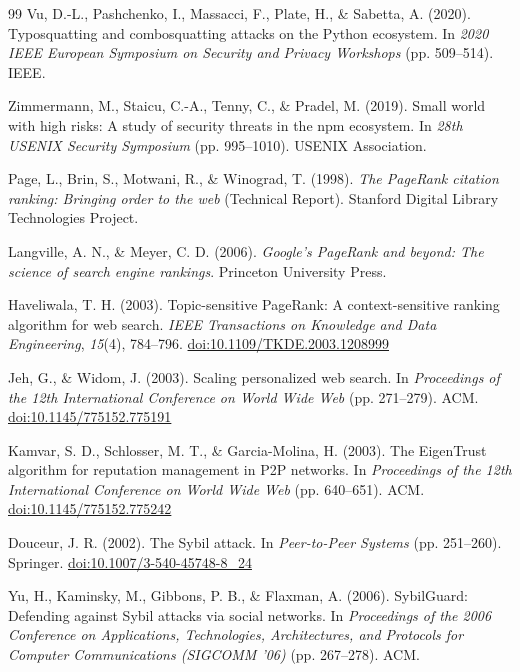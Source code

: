 \begin{thebibliography}{99}
 Vu, D.-L., Pashchenko, I., Massacci, F., Plate, H., \& Sabetta, A. (2020). Typosquatting and combosquatting attacks on the Python ecosystem. In \textit{2020 IEEE European Symposium on Security and Privacy Workshops} (pp. 509--514). IEEE.

 Zimmermann, M., Staicu, C.-A., Tenny, C., \& Pradel, M. (2019). Small world with high risks: A study of security threats in the npm ecosystem. In \textit{28th USENIX Security Symposium} (pp. 995--1010). USENIX Association.

 Page, L., Brin, S., Motwani, R., \& Winograd, T. (1998). \textit{The PageRank citation ranking: Bringing order to the web} (Technical Report). Stanford Digital Library Technologies Project.

 Langville, A. N., \& Meyer, C. D. (2006). \textit{Google's PageRank and beyond: The science of search engine rankings}. Princeton University Press.

 Haveliwala, T. H. (2003). Topic-sensitive PageRank: A context-sensitive ranking algorithm for web search. \textit{IEEE Transactions on Knowledge and Data Engineering}, \textit{15}(4), 784--796. \href{https://doi.org/10.1109/TKDE.2003.1208999}{doi:10.1109/TKDE.2003.1208999}

 Jeh, G., \& Widom, J. (2003). Scaling personalized web search. In \textit{Proceedings of the 12th International Conference on World Wide Web} (pp. 271--279). ACM. \href{https://doi.org/10.1145/775152.775191}{doi:10.1145/775152.775191}

 Kamvar, S. D., Schlosser, M. T., \& Garcia-Molina, H. (2003). The EigenTrust algorithm for reputation management in P2P networks. In \textit{Proceedings of the 12th International Conference on World Wide Web} (pp. 640--651). ACM. \href{https://doi.org/10.1145/775152.775242}{doi:10.1145/775152.775242}

 Douceur, J. R. (2002). The Sybil attack. In \textit{Peer-to-Peer Systems} (pp. 251--260). Springer. \href{https://doi.org/10.1007/3-540-45748-8_24}{doi:10.1007/3-540-45748-8\_24}

 Yu, H., Kaminsky, M., Gibbons, P. B., \& Flaxman, A. (2006). SybilGuard: Defending against Sybil attacks via social networks. In \textit{Proceedings of the 2006 Conference on Applications, Technologies, Architectures, and Protocols for Computer Communications (SIGCOMM '06)} (pp. 267--278). ACM.


\end{thebibliography}
